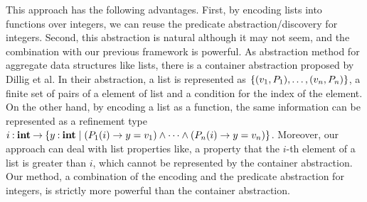 


This approach has the following advantages.  First, by encoding lists
into functions over integers, we can reuse the predicate
abstraction/discovery for integers.  Second, this abstraction is natural
although it may not seem, and the combination with our previous
framework is powerful.  As abstraction method for aggregate data
structures like lists, there is a container abstraction proposed by
Dillig et al.  In their abstraction, a list is represented as
$\{{(v_1,P_1), \dots, (v_n,P_n)}\}$, a finite set of pairs of a element
of list and a condition for the index of the element.  On the other
hand, by encoding a list as a function, the same information can be
represented as a refinement type ${i\mathbin{:}\mathbf{int}}\mathbin{\rightarrow}{\{{y\mathbin{:}\mathbf{int}\mid
(P_1(i) \to y=v_1) \wedge \dots \wedge (P_n(i) \to y=v_n)}\}}$.  Moreover,
our approach can deal with list properties like, a property that the
$i$-th element of a list is greater than $i$, which cannot be represented
by the container abstraction.  Our method, a combination of the
encoding and the predicate abstraction for integers, is strictly more
powerful than the container abstraction.

